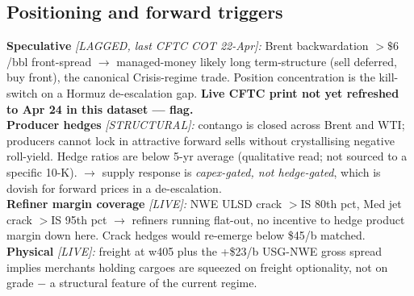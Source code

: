 \documentclass[10pt,a4paper]{article}
\begin{document}
\newpage

\subsection{Positioning and forward triggers}

\begin{callout}
\footnotesize
\textbf{Speculative} \emph{[LAGGED, last CFTC COT 22-Apr]:} Brent backwardation $>\$6$/bbl front-spread $\rightarrow$ managed-money likely long term-structure (sell deferred, buy front), the canonical Crisis-regime trade. Position concentration is the kill-switch on a Hormuz de-escalation gap. \textbf{Live CFTC print not yet refreshed to Apr 24 in this dataset --- flag.}\\[2pt]
\textbf{Producer hedges} \emph{[STRUCTURAL]:} contango is closed across Brent and \mbox{WTI}; producers cannot lock in attractive forward sells without crystallising negative roll-yield. Hedge ratios are below 5-yr average (qualitative read; not sourced to a specific 10-K). $\rightarrow$ supply response is \emph{capex-gated, not hedge-gated}, which is dovish for forward prices in a de-escalation.\\[2pt]
\textbf{Refiner margin coverage} \emph{[LIVE]:} \mbox{NWE} ULSD crack $>$IS 80th pct, Med jet crack $>$IS 95th pct $\rightarrow$ refiners running flat-out, no incentive to hedge product margin down here. Crack hedges would re-emerge below \$45/b matched.\\[2pt]
\textbf{Physical} \emph{[LIVE]:} freight at w405 plus the +\$23/b USG-NWE gross spread implies merchants holding cargoes are squeezed on freight optionality, not on grade $-$ a structural feature of the current regime.
\end{callout}
\end{document}
